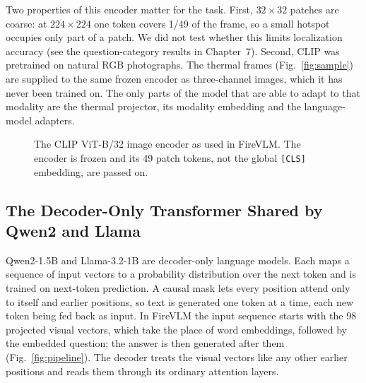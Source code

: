 \documentclass[12pt]{report}
\begin{document}
Two properties of this encoder matter for the task. First, $32\times32$ patches are coarse: at $224\times224$ one token covers 1/49 of the frame, so a small hotspot occupies only part of a patch. We did not test whether this limits localization accuracy (see the question-category results in Chapter~7). Second, CLIP was pretrained on natural RGB photographs. The thermal frames (Fig.~\ref{fig:sample}) are supplied to the same frozen encoder as three-channel images, which it has never been trained on. The only parts of the model that are able to adapt to that modality are the thermal projector, its modality embedding and the language-model adapters.

\begin{figure}[htbp]
  \centering
  \caption{The CLIP ViT-B/32 image encoder as used in FireVLM. The encoder is frozen and its 49 patch tokens, not the global \texttt{[CLS]} embedding, are passed on.}
  \label{fig:clip}
\end{figure}

\subsection{The Decoder-Only Transformer Shared by Qwen2 and Llama}
\label{sec:decoder}
Qwen2-1.5B and Llama-3.2-1B are decoder-only language models. Each maps a sequence of input vectors to a probability distribution over the next token and is trained on next-token prediction. A causal mask lets every position attend only to itself and earlier positions, so text is generated one token at a time, each new token being fed back as input. In FireVLM the input sequence starts with the 98 projected visual vectors, which take the place of word embeddings, followed by the embedded question; the answer is then generated after them (Fig.~\ref{fig:pipeline}). The decoder treats the visual vectors like any other earlier positions and reads them through its ordinary attention layers.
\end{document}
